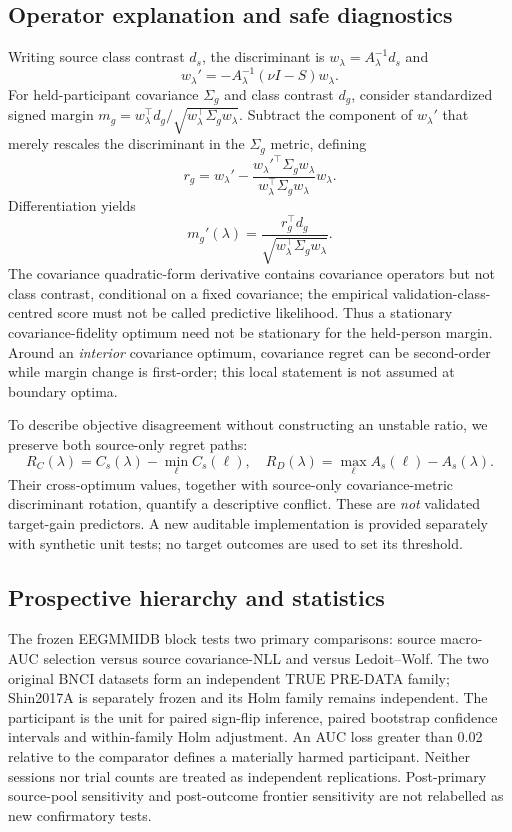 \documentclass[11pt,a4paper]{article}
\begin{document}
\subsection{Operator explanation and safe diagnostics}
Writing source class contrast \(d_s\), the discriminant is
\(w_\lambda=A_\lambda^{-1}d_s\) and
\[
 w_\lambda'=-A_\lambda^{-1}(\nu I-S)w_\lambda.
\]
For held-participant covariance \(\Sigma_g\) and class contrast \(d_g\),
consider standardized signed margin
\(m_g=w_\lambda^\top d_g/\sqrt{w_\lambda^\top\Sigma_gw_\lambda}\).
Subtract the component of \(w_\lambda'\) that merely rescales the
discriminant in the \(\Sigma_g\) metric, defining
\[
 r_g=w_\lambda'-
 \frac{w_\lambda'^\top\Sigma_gw_\lambda}
 {w_\lambda^\top\Sigma_gw_\lambda}w_\lambda.
\]
Differentiation yields
\[
 m_g'(\lambda)=
 \frac{r_g^\top d_g}{\sqrt{w_\lambda^\top\Sigma_gw_\lambda}}.
\]
The covariance quadratic-form derivative contains covariance operators but
not class contrast, conditional on a fixed covariance; the empirical
validation-class-centred score must not be called predictive likelihood. Thus a stationary covariance-fidelity optimum need not
be stationary for the held-person margin. Around an \emph{interior} covariance
optimum, covariance regret can be second-order while margin change is
first-order; this local statement is not assumed at boundary optima.

To describe objective disagreement without constructing an unstable ratio,
we preserve both source-only regret paths:
\[
 R_C(\lambda)=C_s(\lambda)-\min_\ell C_s(\ell),\quad
 R_D(\lambda)=\max_\ell A_s(\ell)-A_s(\lambda).
\]
Their cross-optimum values, together with source-only covariance-metric
discriminant rotation, quantify a descriptive conflict.
These are \emph{not} validated target-gain predictors. A new auditable
implementation is provided separately with synthetic unit tests; no
target outcomes are used to set its threshold.

\subsection{Prospective hierarchy and statistics}
The frozen EEGMMIDB block tests two primary comparisons: source macro-AUC
selection versus source covariance-NLL and versus Ledoit--Wolf.
The two original BNCI datasets form an independent TRUE PRE-DATA family;
Shin2017A is separately frozen and its Holm family remains independent.
The participant is the unit for paired sign-flip inference, paired bootstrap
confidence intervals and within-family Holm adjustment. An AUC loss
greater than 0.02 relative to the comparator defines a materially harmed
participant. Neither sessions nor trial counts are treated as independent
replications. Post-primary source-pool sensitivity and post-outcome frontier
sensitivity are not relabelled as new confirmatory tests.
\end{document}
